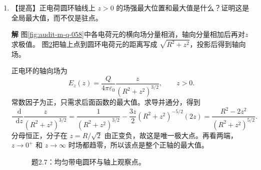\documentclass[11pt,openany,fontset=fandol]{ctexbook}
\theoremstyle{plain}\newtheorem{theorem}{定理}[chapter]\newtheorem{proposition}[theorem]{命题}
\theoremstyle{definition}\newtheorem{definition}{定义}[chapter]\newtheorem{example}{例}[chapter]
\theoremstyle{remark}\newtheorem*{remark}{说明}
\newcommand{\SolutionStart}{\par\nobreak\medskip\nobreak\noindent\textbf{解}\quad\ignorespaces}
\newenvironment{solution}{\SolutionStart}{\par\medskip}
\newcommand{\dd}{\mathop{}\!\mathrm d}\newcommand{\ii}{\mathrm i}\newcommand{\ee}{\mathrm e}
\begin{document}
\begin{enumerate}[label=2.\arabic*]
\begin{solution}
\begin{figure}[H]\centering
{}
\caption{题2.6：引力中心 $F$ 位于焦点，标出的两个距离均从 $F$ 量起。}\label{fig:ex-2-6}
\end{figure}

用近心点检验：该点径向速度为零、横向速度 $h/R$，所以 $\mathcal E=h^2/(2R^2)-\mu/R=3\mu/(4R)-\mu/R=-\mu/(4R)$。远心点以速度 $h/(3R)$ 代入，也得到同一能量。

以焦点为原点的近、远距离不能误当成椭圆半轴；图中的不对称位置正好确定偏心率。
\end{solution}

\item \begin{minipage}[t]{\linewidth}
【提高】正电荷圆环轴线上 $z>0$ 的场强最大位置和最大值是什么？证明这是全局最大值，而不仅是驻点。

\end{minipage}

\begin{solution}
图\ref{fig:audit-m-q-058}中各电荷元的横向场分量相消，轴向分量相加后再对$z$求极值。
图\ref{fig:ex-2-7}把轴上点到圆环电荷元的距离写成 $\sqrt{R^2+z^2}$，投影后得到轴向场。

正电环的轴向场为
\[
E_z(z)=\frac{Q}{4\pi\varepsilon_0}\frac{z}{(R^2+z^2)^{3/2}},\qquad z>0.
\]
常数因子为正，只需求后面函数的最大值。求导并通分，得到
\[
\frac{\dd}{\dd z}\frac{z}{(R^2+z^2)^{3/2}}
=\frac1{(R^2+z^2)^{3/2}}
-\frac{3z}{2}(R^2+z^2)^{-5/2}(2z)
=\frac{R^2-2z^2}{(R^2+z^2)^{5/2}}.
\]
分母恒正，分子在 $z=R/\sqrt2$ 由正变负，故这是唯一极大点。再看两端，$z\to0^+$ 和 $z\to\infty$ 时场都趋零，所以该点是整个正轴的最大值。

\begin{figure}[H]\centering
{}
\caption{题2.7：均匀带电圆环与轴上观察点。}\label{fig:ex-2-7}
\end{figure}


\end{solution}
\end{enumerate}
\end{document}
